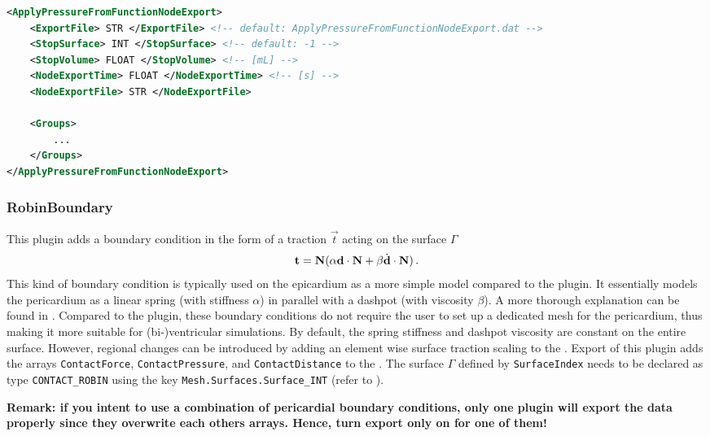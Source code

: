 \begin{lstlisting}[language=XML,caption=.xml settings for the ApplyPressureFromFunctionNodeExport plugin]
<ApplyPressureFromFunctionNodeExport>
    <ExportFile> STR </ExportFile> <!-- default: ApplyPressureFromFunctionNodeExport.dat -->
    <StopSurface> INT </StopSurface> <!-- default: -1 -->
    <StopVolume> FLOAT </StopVolume> <!-- [mL] -->
    <NodeExportTime> FLOAT </NodeExportTime> <!-- [s] -->
    <NodeExportFile> STR </NodeExportFile>

    <Groups>
        ...
    </Groups>
</ApplyPressureFromFunctionNodeExport>
\end{lstlisting}

\subsubsection{RobinBoundary}
\label{plugin:Robin}

This plugin adds a boundary condition in the form of a traction $\vec t$ acting on the surface $\Gamma$
\begin{equation}
    \vec t = \vec N (\alpha \d \cdot \vec N + \beta \dot{\d} \cdot \vec N) \,.
\end{equation}
This kind of boundary condition is typically used on the epicardium as a more simple model compared to the  plugin.
It essentially models the pericardium as a linear spring (with stiffness $\alpha$) in parallel with a dashpot (with viscosity $\beta$).
A more thorough explanation can be found in \cite{pfaller2019importance}.
Compared to the  plugin, these boundary conditions do not require the user to set up a dedicated mesh for the pericardium, thus making it more suitable for (bi-)ventricular simulations.
By default, the spring stiffness and dashpot viscosity are constant on the entire surface.
However, regional changes can be introduced by adding an element wise surface traction scaling to the .
Export of this plugin adds the arrays \verb|ContactForce|, \verb|ContactPressure|, and \verb|ContactDistance| to the .
The surface $\Gamma$ defined by \verb|SurfaceIndex| needs to be declared as type \verb|CONTACT_ROBIN| using the key \verb|Mesh.Surfaces.Surface_INT| (refer to ).

\textbf{Remark: if you intent to use a combination of pericardial boundary conditions, only one plugin will export the data properly since they overwrite each others arrays. Hence, turn export only on for one of them!}

